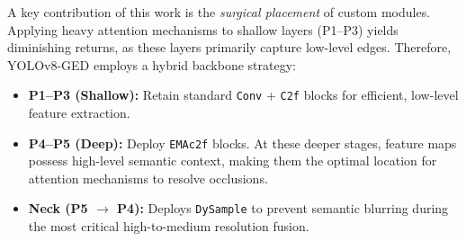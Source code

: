 A key contribution of this work is the \textit{surgical placement} of custom modules. Applying heavy attention mechanisms to shallow layers (P1--P3) yields diminishing returns, as these layers primarily capture low-level edges. Therefore, YOLOv8-GED employs a hybrid backbone strategy:

\begin{itemize}
    \item \textbf{P1--P3 (Shallow):} Retain standard \texttt{Conv} + \texttt{C2f} blocks for efficient, low-level feature extraction.
    
    \item \textbf{P4--P5 (Deep):} Deploy \texttt{EMAc2f} blocks. At these deeper stages, feature maps possess high-level semantic context, making them the optimal location for attention mechanisms to resolve occlusions.
    
    \item \textbf{Neck (P5 $\rightarrow$ P4):} Deploys \texttt{DySample} to prevent semantic blurring during the most critical high-to-medium resolution fusion.
\end{itemize}

